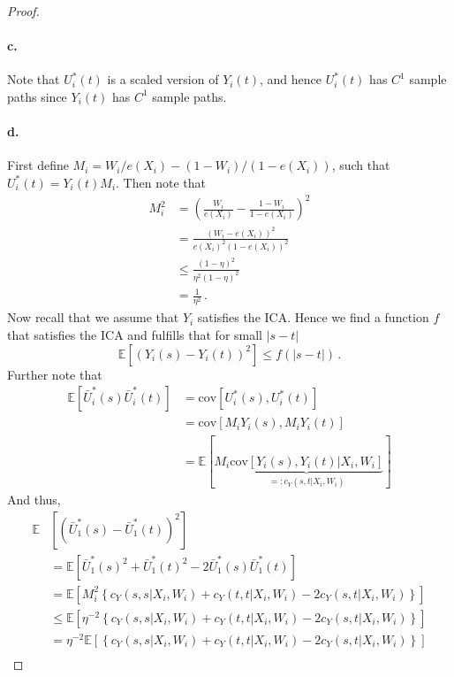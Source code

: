 \begin{proof}
    \paragraph{c.}
    Note that $U_i^\ast(t)$ is a scaled version of $Y_i(t)$, and hence $U_i^\ast(t)$ has $C^1$
    sample paths since $Y_i(t)$ has $C^1$ sample paths.

    \paragraph{d.}
    First define $M_i = W_i / e(X_i) - (1 - W_i)/(1 - e(X_i))$, such that $U_i^\ast(t) =
    Y_i(t) M_i$. Then note that
    \begin{align}
        M_i^2
        &= (\frac{W_i}{e(X_i)} - \frac{1 - W_i}{1 - e(X_i)})^2 \\
        &= \frac{(W_i - e(X_i))^2}{e(X_i)^2 (1 - e(X_i))^2} \\
        &\leq \frac{(1-\eta)^2}{\eta^2 (1 - \eta)^2} \\
        &= \frac{1}{\eta^2} \,.
    \end{align}
    Now recall that we assume that $Y_i$ satisfies the ICA. Hence we find a function $f$
    that satisfies the ICA and fulfills that for small $|s - t|$
    \[
        \mathbb{E}[(Y_i(s) - Y_i(t))^2] \leq f(|s - t|) \,.
    \]
    Further note that
    \begin{align}
        \mathbb{E}[\bar{U}_i^\ast(s) \bar{U}_i^\ast(t)]
        &= \mathrm{cov}[U_i^\ast(s), U_i^\ast(t)] \\
        &= \mathrm{cov}[M_i Y_i(s), M_i Y_i(t)] \\
        &= \mathbb{E}[M_i \underbrace{\mathrm{cov}[Y_i(s), Y_i(t) | X_i, W_i]}_{=:c_Y(s, t | X_i, W_i)}]
    \end{align}
    And thus,
    \begin{align}
        \mathbb{E}&[(\bar{U}_1^\ast(s) - \bar{U}_1^\ast(t))^2] \\
        &= \mathbb{E}[\bar{U}_1^\ast(s)^2 + \bar{U}_1^\ast(t)^2 - 2 \bar{U}_1^\ast(s) \bar{U}_1^\ast(t)] \\
        &= \mathbb{E}\left[M_i^2 \left\{c_Y(s, s | X_i, W_i) + c_Y(t, t| X_i, W_i) - 2 c_Y(s, t | X_i, W_i)\right\}\right] \\
        &\leq \mathbb{E}\left[\eta^{-2} \left\{c_Y(s, s | X_i, W_i) + c_Y(t, t| X_i, W_i) - 2 c_Y(s, t | X_i, W_i)\right\}\right] \\
        &= \eta^{-2} \mathbb{E}\left[\left\{c_Y(s, s | X_i, W_i) + c_Y(t, t| X_i, W_i) - 2 c_Y(s, t | X_i, W_i)\right\}\right]\\

\end{align}
\end{proof}
